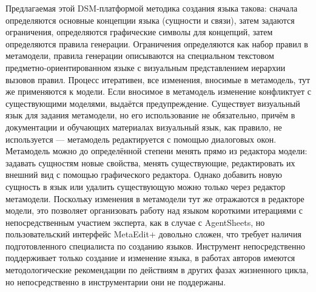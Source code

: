 Предлагаемая этой DSM-платформой методика создания языка такова: сначала определяются 
основные концепции языка (сущности и связи), затем задаются ограничения, определяются 
графические символы для концепций, затем определяются правила генерации. Ограничения определяются
как набор правил в метамодели, правила генерации описываются на специальном текстовом 
предметно-ориентированном языке с визуальным представлением иерархии вызовов правил.
Процесс итеративен, все изменения, вносимые в метамодель, тут же применяются к модели. Если вносимое в метамодель 
изменение конфликтует с существующими моделями, выдаётся предупреждение. Существует визуальный 
язык для задания метамодели, но его использование не обязательно, причём в документации и 
обучающих материалах визуальный язык, как правило, не используется --- метамодель редактируется 
с помощью диалоговых окон. Метамодель можно до определённой степени менять прямо из редактора 
модели: задавать сущностям новые свойства, менять существующие, редактировать их внешний 
вид с помощью графического редактора. Однако добавить новую сущность в язык или удалить существующую можно только через 
редактор метамодели. Поскольку изменения в метамодели тут же отражаются в редакторе модели, 
это позволяет организовать работу над языком короткими итерациями с непосредственным 
участием эксперта, как в случае с AgentSheets, но пользовательский интерфейс MetaEdit+ 
довольно сложен, что требует наличия подготовленного специалиста по созданию языков. 
Инструмент непосредственно поддерживает только создание и изменение языка, в работах авторов 
имеются методологические рекомендации по действиям в других фазах жизненного цикла, но 
непосредственно в инструментарии они не поддержаны.

